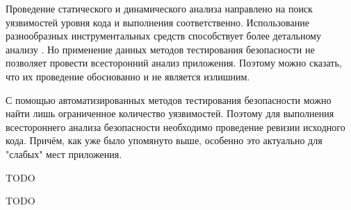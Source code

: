 %
Проведение статического и динамического анализа направлено на поиск уязвимостей уровня кода и выполнения соответственно. 
%
Использование разнообразных инструментальных средств способствует более детальному анализу \PeerHood. 
%
Но применение данных методов тестирования безопасности не позволяет провести всесторонний анализ приложения. 
%
Поэтому можно сказать, что их проведение обоснованно и не является излишним.

%
С помощью автоматизированных методов тестирования безопасности можно найти лишь ограниченное количество уязвимостей. 
%
Поэтому для выполнения всестороннего анализа безопасности \PeerHood необходимо проведение ревизии исходного кода. 
%
Причём, как уже было упомянуто выше, особенно это актуально для "слабых" мест приложения. 



%
TODO
%
\begin{comment}
На что направлено тестирование: на анализ исходного кода, поиск в нём ошибок безопасности
Как оно будет происходить: анализ исходного кода с помощью инструментальных средств
Что будет использовано: только инструментальные средства
Какие результаты будут получены: информация об ошибках программирования
Что они дадут (связь с задачами тестирования): как найденные ошибки влияют на безопасность, с каким риском связаны, можно ли провести атаку
\end{comment}

%
TODO
%
\begin{comment}
Используется во время разработки приложения
Установить цели ревизии
Использовать инструментальные средства
По отчётам провести ревизию слабых мест (анализ отчёта)
Недостатки: является лишь вспомогательным инструментом, для выявления ошибок времени выполнение применяются другие методы тестироавания
Инструменты: Splint, RATS, ITS4, PVS Studio, GCC (флаги компилятора)

Поиск ошибок программирования с помощью инструментальных средств
Найденные ошибки проанализировать на степень их влияния на безопасность
Уязвимости связать с возможностью атак и с рисками безопасности => влияние на защищённость
Используемые инструменты: RATS, ITS4, PVS Studio, GCC
\end{comment}

